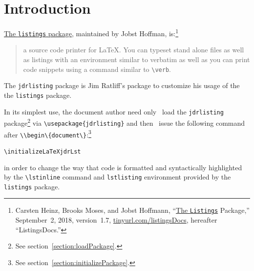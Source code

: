 \documentclass[12pt,table,final]{article}%
\begin{document}
\listoftables
\listoffigures
\lstlistoflistings
\clearpage
\listoflabels
\clearpage


\section{Introduction}
\href{https://ctan.org/pkg/listings?lang=en}{The \lstinline$listings$ package}, maintained by Jobst Hoffman, is:\footnote{Carsten Heinz, Brooks Moses, and Jobst Hoffmann, ``\href{http://mirrors.ctan.org/macros/latex/contrib/listings/listings.pdf}{The \lstinline$Listings$} Package,'' September~2, 2018, version~1.7, \href{https://tinyurl.com/listingsDocs}{tinyurl.com/listingsDocs}, hereafter ``ListingsDocs.''}
\begin{quote}
a source code printer for \LaTeX. You can typeset stand alone files as well as listings with an environment similar to verbatim as well as you can print code snippets using a command similar to \lstinline$\verb$.
\end{quote}

The \lstinline$jdrlisting$ package is Jim Ratliff's package to customize his usage of the the \lstinline$listings$ package.

In its simplest use, the document author need only ~load the \lstinline|jdrlisting| package\footnote{See section~\ref{section:loadPackage}.} via \lstinline|\usepackage{jdrlisting}| and then ~issue the following command after \mbox{\lstinline|\\begin\{document\}|}:\footnote{See section~\ref{section:initializePackage}.}
\begin{jdrCodeSnip}
\lstinline|\initializeLaTeXjdrLst|
\end{jdrCodeSnip}
in order to change the way that code is formatted and syntactically highlighted by the \lstinline|\lstinline| command and \lstinline|lstlisting| environment provided by the \lstinline|listings| package. 
\end{document}
